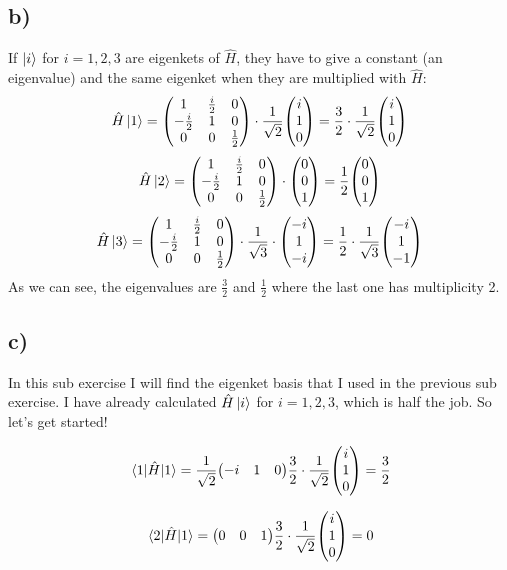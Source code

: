 \documentclass{scrartcl}
\begin{document}
\subsection*{b)}
If $\ket{i}$ for $i = 1,2,3$ are eigenkets of $\hat{H}$, they have to give a constant (an eigenvalue) and the same eigenket when they are multiplied with $\hat{H}$:
$$\hat{H}\ket{1}=\mqty(1 & \frac{i}{2} & 0 \\ -\frac{i}{2} & 1 & 0 \\ 0 & 0 & \frac{1}{2})\cdot\frac{1}{\sqrt{2}}\mqty(i \\ 1 \\ 0)=\frac{3}{2}\cdot\frac{1}{\sqrt{2}}\mqty(i \\ 1 \\ 0)$$
$$\hat{H}\ket{2}=\mqty(1 & \frac{i}{2} & 0 \\ -\frac{i}{2} & 1 & 0 \\ 0 & 0 & \frac{1}{2})\cdot\mqty(0 \\ 0 \\ 1)=\frac{1}{2}\mqty(0 \\ 0 \\ 1)$$
$$\hat{H}\ket{3}=\mqty(1 & \frac{i}{2} & 0 \\ -\frac{i}{2} & 1 & 0 \\ 0 & 0 & \frac{1}{2})\cdot\frac{1}{\sqrt{3}}\cdot\mqty(-i \\ 1 \\ -i)=\frac{1}{2}\cdot\frac{1}{\sqrt{3}}\mqty(-i \\ 1 \\ -1)$$
As we can see, the eigenvalues are $\frac{3}{2}$ and $\frac{1}{2}$ where the last one has multiplicity 2.

\subsection*{c)}
In this sub exercise I will find the eigenket basis that I used in the previous sub exercise. I have already calculated $\hat{H}\ket{i}$ for $i=1,2,3$, which is half the job. So let's get started!

$$\mel*{1}{\hat{H}}{1}=\frac{1}{\sqrt{2}}\mqty(-i & 1 & 0)\frac{3}{2}\cdot\frac{1}{\sqrt{2}}\mqty(i \\ 1  \\ 0) = \frac{3}{2}$$

$$\mel*{2}{\hat{H}}{1}=\mqty(0 & 0 & 1)\frac{3}{2}\cdot\frac{1}{\sqrt{2}}\mqty(i \\ 1 \\ 0) = 0$$
\end{document}
